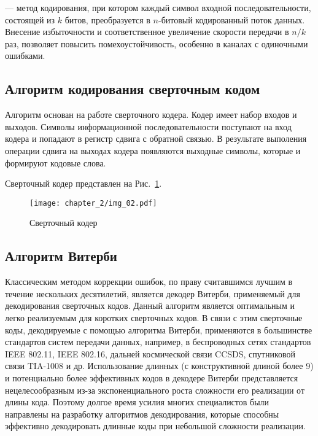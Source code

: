 \begin{definition} 
 --- метод кодирования, при котором каждый символ входной последовательности, 
состоящей из $k$ битов, преобразуется в $n$-битовый кодированный поток данных. Внесение избыточности и 
соответственное увеличение скорости передачи в $n/k$ раз, позволяет повысить помехоустойчивость, особенно в 
каналах с одиночными ошибками.
\end{definition}

\subsection{Алгоритм кодирования сверточным кодом}
Алгоритм основан на работе сверточного кодера. Кодер имеет набор входов и выходов. Символы информационной
последовательности поступают на вход кодера и попадают в регистр сдвига с обратной связью. В результате
выполения операции сдвига на выходах кодера появляются выходные символы, которые и формируют кодовые слова.

Сверточный кодер представлен на Рис.~\ref{img_02}.

\begin{figure}[htbp]
\begin{center}
\texttt{[image: chapter\_2/img\_02.pdf]}
\end{center}
\caption{Сверточный кодер}
\label{img_02}
\end{figure}

\subsection{Алгоритм Витерби}
Классическим методом коррекции ошибок, по праву считавшимся лучшим в течение нескольких десятилетий, является 
декодер Витерби, применяемый для декодирования сверточных кодов. Данный алгоритм является оптимальным и легко 
реализуемым для коротких сверточных кодов. В связи с этим сверточные коды, декодируемые с помощью алгоритма 
Витерби, применяются в большинстве стандартов систем передачи данных, например, в беспроводных сетях 
стандартов IEEE 802.11, IEEE 802.16, дальней космической связи CCSDS, спутниковой связи TIA-1008 и др. 
Использование длинных (с конструктивной длиной более 9) и потенциально более эффективных кодов в декодере 
Витерби представляется нецелесообразным из-за экспоненциального роста сложности его реализации от длины кода. 
Поэтому долгое время усилия многих специалистов были направлены на разработку алгоритмов декодирования, 
которые способны эффективно декодировать длинные коды при небольшой сложности реализации.

